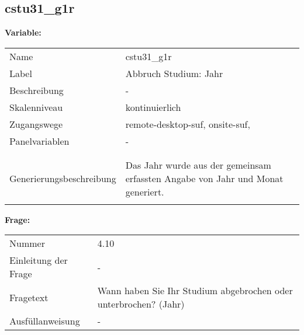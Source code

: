 	
	
	\subsection{cstu31\_g1r}
	\label{subSection:cstu31_g1r}

	\noindent\textbf{Variable:}\\
		\begin{tabular}{lL{11.3cm}}
			\label{tableVariable:cstu31_g1r}
			Name & cstu31\_g1r \\
			Label & Abbruch Studium: Jahr \\
			Beschreibung & - \\
			Skalenniveau & kontinuierlich \\
			Zugangswege &
				remote-desktop-suf,
				onsite-suf,
 \\
			Panelvariablen & -
			 \\
			 \\
 \\
					Generierungsbeschreibung & Das Jahr wurde aus der gemeinsam erfassten Angabe von Jahr und Monat generiert. 
				 \\	
			 \\
		\end{tabular}

		\vspace*{1 cm}
		\noindent\textbf{Frage:}\\
		\begin{tabular}{lL{11.3cm}}
			\label{tableQuestion:cstu31_g1r}
			Nummer & 4.10 \\
			Einleitung der Frage & - \\
			Fragetext & Wann haben Sie Ihr Studium abgebrochen oder unterbrochen?
(Jahr) \\
			Ausfüllanweisung & - \\
		\end{tabular}





